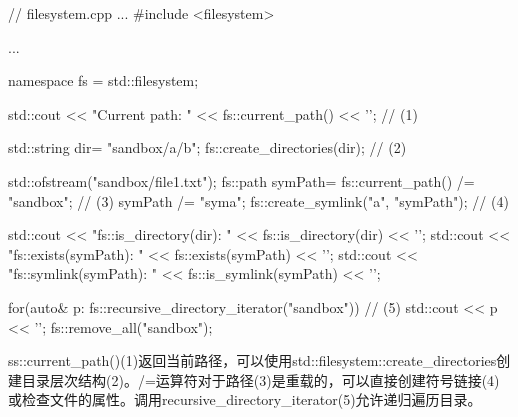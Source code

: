 
\begin{cpp}
// filesystem.cpp
...
#include <filesystem>

...

namespace fs = std::filesystem;

std::cout << "Current path: " << fs::current_path() << '\n'; // (1)

std::string dir= "sandbox/a/b";
fs::create_directories(dir); // (2)

std::ofstream("sandbox/file1.txt");
fs::path symPath= fs::current_path() /= "sandbox"; // (3)
symPath /= "syma";
fs::create_symlink("a", "symPath"); // (4)

std::cout << "fs::is_directory(dir): " << fs::is_directory(dir) << '\n';
std::cout << "fs::exists(symPath): " << fs::exists(symPath) << '\n';
std::cout << "fs::symlink(symPath): " << fs::is_symlink(symPath) << '\n';

for(auto& p: fs::recursive_directory_iterator("sandbox")){ // (5)
	std::cout << p << '\n';
}
fs::remove_all("sandbox");
\end{cpp}

ss::current\_path()(1)返回当前路径，可以使用std::filesystem::create\_directories创建目录层次结构(2)。/=运算符对于路径(3)是重载的，可以直接创建符号链接(4)或检查文件的属性。调用recursive\_directory\_iterator(5)允许递归遍历目录。
































